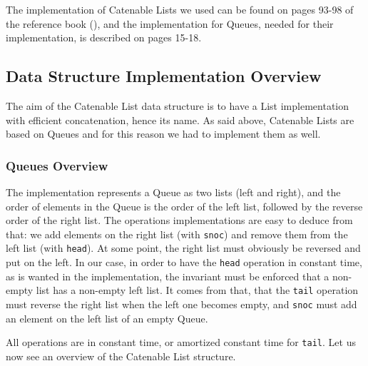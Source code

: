 The implementation of Catenable Lists we used can be found 
on pages 93-98 of the reference book (\cite{Okasaki}),
and the implementation for Queues, needed for their implementation, 
is described on pages 15-18.

\subsection{Data Structure Implementation Overview}
The aim of the Catenable List data structure is 
to have a List implementation with efficient concatenation, 
hence its name.
As said above, Catenable Lists are based on Queues
and for this reason we had to implement them as well.

\subsubsection{Queues Overview}
The implementation represents a Queue as two lists (left and right), 
and the order of elements in the Queue is the order of the left list, 
followed by the reverse order of the right list.
The operations implementations are easy to deduce from that: 
we add elements on the right list (with \verb|snoc|) 
and remove them from the left list (with \verb|head|).
At some point, the right list must obviously be reversed and put on the left.
In our case, in order to have the \verb|head|
operation in constant time,
as is wanted in the implementation,
the invariant must be enforced that a non-empty list has a non-empty left list.
It comes from that, 
that the \verb|tail| operation must reverse the right list when the left one becomes empty, 
and \verb|snoc| must add an element on the left list of an empty Queue.

All operations are in constant time, or amortized constant time for \verb|tail|.
Let us now see an overview of the Catenable List structure.

